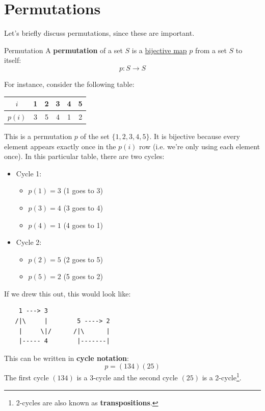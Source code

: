 \documentclass[letterpaper]{article}
\begin{document}
\section{Permutations}
Let's briefly discuss permutations, since these are important.
\begin{definition}{Permutation}{}
    A \textbf{permutation} of a set $S$ is a \underline{bijective map} $p$ from a set $S$ to itself: 
    \[p: S \to S\]
\end{definition}
For instance, consider the following table: 
\begin{center}
    \begin{tabular}{|c|c c c c c|}
        \hline 
        $i$ & 1 & 2 & 3 & 4 & 5 \\ 
        \hline 
        $p(i)$ & 3 & 5 & 4 & 1 & 2 \\ 
        \hline 
    \end{tabular}
\end{center}
This is a permutation $p$ of the set $\{1, 2, 3, 4, 5\}$. It is bijective because every element appears exactly once in the $p(i)$ row (i.e. we're only using each element once). In this particular table, there are two cycles:
\begin{itemize}
    \item Cycle 1: 
    \begin{itemize}
        \item $p(1) = 3$ (1 goes to 3)
        \item $p(3) = 4$ (3 goes to 4)
        \item $p(4) = 1$ (4 goes to 1)
    \end{itemize}
    \item Cycle 2: 
    \begin{itemize}
        \item $p(2) = 5$ (2 goes to 5)
        \item $p(5) = 2$ (5 goes to 2)
    \end{itemize}
\end{itemize}
If we drew this out, this would look like: 
\begin{verbatim}
    1 ---> 3
   /|\     |        5 ----> 2
    |     \|/      /|\      |
    |----- 4        |-------|
\end{verbatim}
This can be written in \textbf{cycle notation}:
\[p = (1 3 4)(2 5)\]
The first cycle $(1 3 4)$ is a 3-cycle and the second cycle $(2 5)$ is a 2-cycle\footnote{2-cycles are also known as \textbf{transpositions}.}.
\end{document}

